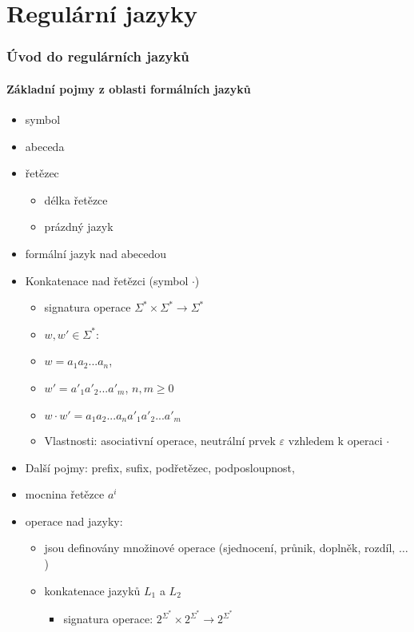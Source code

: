 \documentclass[a4paper, 12pt]{article}
\author{Anonymous}
\begin{document}
\part{Regulární jazyky}
\section{Úvod do regulárních jazyků}

\subsection{Základní pojmy z oblasti formálních jazyků}
\begin{itemize}
	\item symbol
	\item abeceda
	\item řetězec
	\begin{itemize}
		\item délka řetězce
		\item prázdný jazyk
	\end{itemize}
	\item formální jazyk nad abecedou
	\item Konkatenace nad řetězci (symbol $\cdot$)
	\begin{itemize}
		\item signatura operace $\Sigma^* \times \Sigma^* \rightarrow \Sigma^*$
		\item $w,w' \in \Sigma^*$: 
		\item $w = a_1a_2...a_n$, 
		\item $w' = a'_1a'_2...a'_m$, $n,m \geq 0$
		\item $w \cdot w' = a_1a_2...a_na'_1a'_2...a'_m$
		\item Vlastnosti: asociativní operace, neutrální prvek $\varepsilon$ vzhledem k operaci $\cdot$
	\end{itemize}
	\item Další pojmy: prefix, sufix, podřetězec, podposloupnost,
	\item mocnina řetězce $a^i$
	\item operace nad jazyky:
	\begin{itemize}
		\item jsou definovány množinové operace (sjednocení, průnik, doplněk, rozdíl, $\ldots$)
		\item konkatenace jazyků $L_1$ a $L_2$
		\begin{itemize}
			\item signatura operace: $2^{\Sigma^*} \times 2^{\Sigma^*} \rightarrow 2^{\Sigma^*}$

\end{itemize}
\end{itemize}
\end{itemize}
\end{document}
